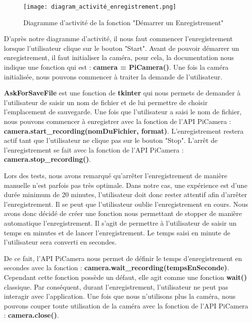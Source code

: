             \begin{figure}[ht]
                \centering
                \texttt{[image: diagram\_activité\_enregistrement.png]} 
                \caption{Diagramme d'activité de la fonction "Démarrer un Enregistrement"}
            \end{figure}

            
            D'après notre diagramme d'activité, il nous faut commencer l'enregistrement lorsque l'utilisateur clique sur le bouton "Start". Avant de pouvoir démarrer un enregistrement, il faut initialiser la caméra, pour cela, la documentation nous indique une fonction qui est : \textbf{camera = PiCamera()}. Une fois la caméra initialisée, nous pouvons commencer à traiter la demande de l'utilisateur.

            \vspace{0.7cm}
            
            \textbf{AskForSaveFile} est une fonction de \textbf{tkinter} qui nous permets de demander à l'utilisateur de saisir un nom de fichier et de lui permettre de choisir l'emplacement de sauvegarde. Une fois que l'utilisateur a saisi le nom de fichier, nous pouvons commencer à enregistrer avec la fonction de l'API PiCamera : \textbf{camera.start\_recording(nomDuFichier, format)}.
            L'enregistrement restera actif tant que l'utilisateur ne clique pas sur le bouton "Stop".
            L'arrêt de l'enregistrement se fait avec la fonction de l'API PiCamera : \textbf{camera.stop\_recording()}.

            \vspace{0.2cm}

            Lors des tests, nous avons remarqué qu'arrêter l'enregistrement de manière manuelle n'est parfois pas très optimale. Dans notre cas, une expérience est d'une durée minimum de 20 minutes, l'utilisateur doit donc rester attentif afin d'arrêter l'enregistrement. Il se peut que l'utilisateur oublie l'enregistrement en cours. Nous avons donc décidé de créer une fonction nous permettant de stopper de manière automatique l'enregistrement. Il s'agit de permettre à l'utilisateur de saisir un temps en minutes et de lancer l'enregistrement. Le temps saisi en minute de l'utilisateur sera converti en secondes.

            \vspace{0.2cm}

            De ce fait, l'API PiCamera nous permet de définir le temps d'enregistrement en secondes avec la fonction : \textbf{camera.wait\_recording(tempsEnSeconde)}. Cependant cette fonction possède un défaut, elle agit comme une fonction \textbf{wait()} classique. Par conséquent, durant l'enregistrement, l'utilisateur ne peut pas interagir avec l'application. Une fois que nous n'utilisons plus la caméra, nous pouvons couper toute utilisation de la caméra avec la fonction de l'API PiCamera : \textbf{camera.close()}.
            
